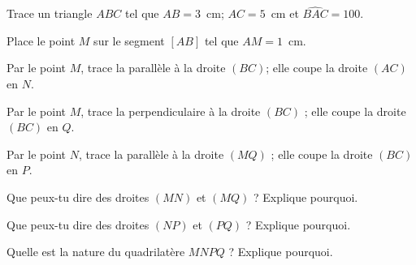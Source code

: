 \begin{myenumerate}
\item Trace un triangle $ABC$ tel que $AB=3$~cm; $AC=5$~cm et
$\widehat{BAC}=100$\degres.
\item Place le point $M$ sur le segment $[AB]$ tel que $AM=1$~cm.
\item Par le point $M$, trace la parallèle à la droite $(BC)$; elle
coupe la droite $(AC)$ en $N$.
\par Par le point $M$, trace la perpendiculaire à la droite $(BC)$ ;
elle coupe la droite $(BC)$ en $Q$.
\par Par le point $N$, trace la parallèle à la droite $(MQ)$ ; elle
coupe la droite $(BC)$ en $P$. 
\item Que peux-tu dire des droites $(MN)$ et $(MQ)$ ? Explique
pourquoi.
\item Que peux-tu dire des droites $(NP)$ et $(PQ)$ ? Explique
pourquoi.
\item Quelle est la nature du quadrilatère $MNPQ$ ? Explique pourquoi.
\end{myenumerate}